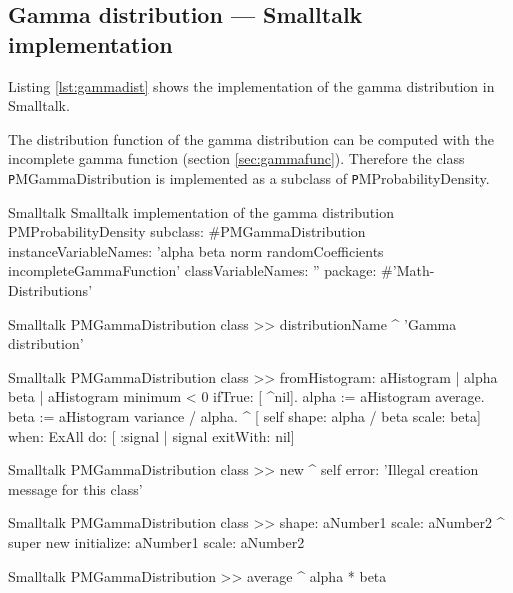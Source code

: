 \subsection{Gamma distribution --- Smalltalk implementation}
\label{sec:sgammadist}  Listing \ref{lst:gammadist} shows the implementation of
the gamma distribution in Smalltalk.

The distribution function of the gamma distribution can be computed with the incomplete gamma function (\cf section \ref{sec:gammafunc}).
Therefore the class {\texttt PMGammaDistribution} is implemented as a subclass of {\texttt PMProbabilityDensity}.

%
\begin{listing}[label=lst:gammadist]{Smalltalk}
{Smalltalk implementation of the gamma distribution}
PMProbabilityDensity subclass: #PMGammaDistribution
   instanceVariableNames: 'alpha beta norm randomCoefficients incompleteGammaFunction'
    classVariableNames: ''
    package: #'Math-Distributions'
\end{listing}

\begin{displaycode}{Smalltalk}
PMGammaDistribution class >> distributionName
    ^ 'Gamma distribution'
\end{displaycode}

\begin{displaycode}{Smalltalk}
PMGammaDistribution class >> fromHistogram: aHistogram
    | alpha beta |
    aHistogram minimum < 0
        ifTrue: [ ^nil].
    alpha := aHistogram average.
    beta := aHistogram variance / alpha.
    ^ [ self shape: alpha / beta scale: beta] when: ExAll do: [ 
                                       :signal | signal exitWith: nil]
\end{displaycode}

\begin{displaycode}{Smalltalk}
PMGammaDistribution class >> new
    ^ self error: 'Illegal creation message for this class'
\end{displaycode}

\begin{displaycode}{Smalltalk}
PMGammaDistribution class >> shape: aNumber1 scale: aNumber2
    ^ super new initialize: aNumber1 scale: aNumber2
\end{displaycode}

\begin{displaycode}{Smalltalk}
PMGammaDistribution >> average
    ^ alpha * beta
\end{displaycode}

